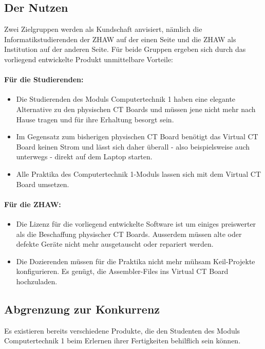 \documentclass[10pt]{article}
\begin{document}
\subsection{Der Nutzen}

Zwei Zielgruppen werden als Kundschaft anvisiert, nämlich die Informatikstudierenden der ZHAW auf der einen Seite und die ZHAW als Institution auf der anderen Seite. Für beide Gruppen ergeben sich durch das vorliegend entwickelte Produkt unmittelbare Vorteile:

\paragraph{Für die Studierenden:}
\begin{itemize}
\item Die Studierenden des Moduls \glqq Computertechnik 1\grqq{} haben eine elegante Alternative zu den physischen CT Boards und müssen jene nicht mehr nach Hause tragen und für ihre Erhaltung besorgt sein.
\item Im Gegensatz zum bisherigen physischen CT Board benötigt das \glqq Virtual CT Board\grqq{} keinen Strom und lässt sich daher überall - also beispielsweise auch unterwegs - direkt auf dem Laptop starten.
\item Alle Praktika des \glqq Computertechnik 1\grqq-Moduls lassen sich mit dem \glqq Virtual CT Board\grqq{} umsetzen.
\end{itemize}

\paragraph{Für die ZHAW:}
\begin{itemize}
\item Die Lizenz für die vorliegend entwickelte Software ist um einiges preiswerter als die Beschaffung physischer CT Boards. Ausserdem müssen alte oder defekte Geräte nicht mehr ausgetauscht oder repariert werden.
\item Die Dozierenden müssen für die Praktika nicht mehr mühsam Keil-Projekte konfigurieren. Es genügt, die Assembler-Files ins \glqq Virtual CT Board\grqq{} hochzuladen.
\end{itemize}

\subsection{Abgrenzung zur Konkurrenz}

Es existieren bereits verschiedene Produkte, die den Studenten des Moduls \glqq Computertechnik 1\grqq{} beim Erlernen ihrer Fertigkeiten behilflich sein können.
\end{document}
